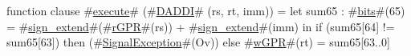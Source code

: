function clause #\hyperref[zexecute]{execute}# (#\hyperref[zDADDI]{DADDI}# (rs, rt, imm)) =
  {
    let sum65 : #\hyperref[zbits]{bits}#(65) = #\hyperref[zsignzyextend]{sign\_extend}#(#\hyperref[zrGPR]{rGPR}#(rs)) + #\hyperref[zsignzyextend]{sign\_extend}#(imm) in
    {
      if (sum65[64] != sum65[63]) then
        (#\hyperref[zSignalException]{SignalException}#(Ov))
      else
        #\hyperref[zwGPR]{wGPR}#(rt) = sum65[63..0]
    }
  }
